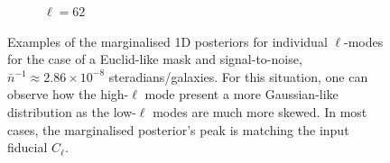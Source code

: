 \begin{figure}
\begin{subfigure}{.5\textwidth}
  \caption{$\ell = 62$}
\end{subfigure}
\caption[Examples of marginalised 1D posteriors for individual $\ell$-modes for the case of a Euclid-like mask and signal-to-noise.]{Examples of the marginalised 1D posteriors for individual $\ell$-modes for the case of a Euclid-like mask and signal-to-noise, $\bar{n}^{-1}\approx 2.86\times 10^{-8}$ steradians/galaxies. For this situation, one can observe how the high-$\ell$ mode present a more Gaussian-like distribution as the low-$\ell$ modes are much more skewed. In most cases, the marginalised posterior's peak is matching the input fiducial $C_{\ell}$.}
\label{fig:BPL:Euclid-Ells-HighSN}
\end{figure}







